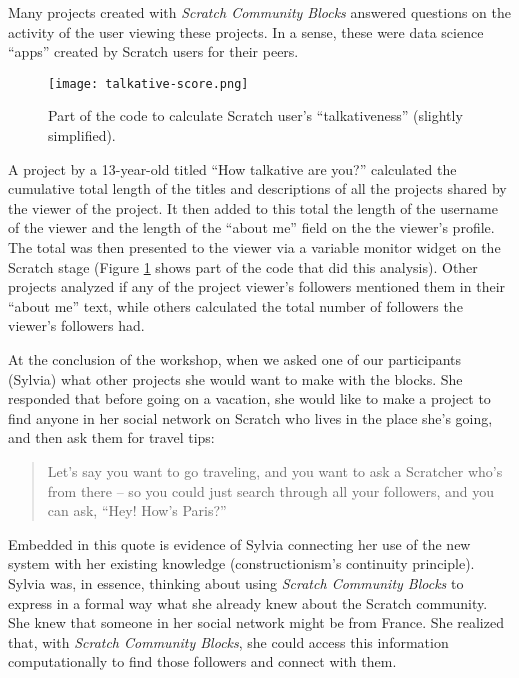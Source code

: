 \documentclass{sigchi}
\begin{document}
Many projects created with \emph{Scratch Community Blocks} answered questions on the activity of the user viewing these projects. In a sense, these were data science ``apps'' created by Scratch users for their peers.

\begin{figure}[h!] 
\texttt{[image: talkative-score.png]}
\centering
\caption{Part of the code to calculate Scratch user's ``talkativeness'' (slightly simplified).}
\label{fig:example-talkative}
\end{figure}


A project by a 13-year-old titled ``How talkative are you?'' calculated the cumulative total length of the titles and descriptions of all the projects shared by the viewer of the project. It then added to this total the length of the username of the viewer and the length of the ``about me'' field on the the viewer's profile. The total was then presented to the viewer via a variable monitor widget on the Scratch stage (Figure \ref{fig:example-talkative} shows part of the code that did this analysis).
Other projects analyzed if any of the project viewer's followers mentioned them in their ``about me'' text, while others calculated the total number of followers the viewer's followers had. 

At the conclusion of the workshop, when we asked one of our participants (Sylvia) what other projects she would want to make with the blocks. She responded that before going on a vacation, she would like to make a project to find anyone in her social network on Scratch who lives in the place she's going, and then ask them for travel tips:

\begin{quote}
Let's say you want to go traveling, and you want to ask a Scratcher who's from there – so you could just search through all your followers, and you  can ask, ``Hey! How's Paris?''
\end{quote}

Embedded in this quote is evidence of Sylvia connecting her use of the new system with her existing knowledge (constructionism's continuity principle). Sylvia was, in essence, thinking about using \textit{Scratch Community Blocks} to express in a formal way what she already knew about the Scratch community. She knew that someone in her social network might be from France. She realized that, with \emph{Scratch Community Blocks}, she could access this information computationally to find those followers and connect with them.
\end{document}
